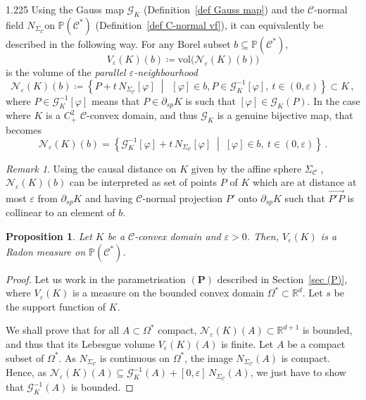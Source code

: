 \documentclass[reqno, a4paper]{amsart}
\numberwithin{equation}{section}
\numberwithin{figure}{section}
\newtheorem{proposition}[theorem]{Proposition}
\theoremstyle{definition}
\theoremstyle{remark}
\newtheorem{remark}[theorem]{Remark}
\newcommand{\R}{\mathbb{R}} %
\renewcommand{\P}{\mathbb{P}} %
\newcommand{\C}{\mathcal{C}} %
\renewcommand{\S}{\Sigma_\C} %
\newcommand{\G}{\mathcal{G}} %
\newcommand{\vol}{\mathrm{vol}} %
\newcommand{\st}{\; \middle\vert \;} %
\newcommand{\bp}[1]{{\bigl( {#1} \bigr)}} %
\begin{document}
\begin{spacing}{1.225}
Using the Gauss map $\G_K$ (Definition~\ref{def Gauss map}) and the $\C$-normal field $N_{\S} $on $\P(\C^*)$ (Definition~\ref{def C-normal vf}), it can equivalently be described in the following way. For any Borel subset $b \subseteq \P(\C^*)$,
\begin{equation*}
V_\varepsilon(K)(b) \coloneqq \vol \bp{\mathcal{N}_\varepsilon(K)(b)}  
\end{equation*}
is the volume of the \emph{parallel $\varepsilon$-neighbourhood} 
\begin{equation*}
\mathcal{N}_\varepsilon(K)(b) \coloneqq \left\lbrace P + t \, N_{\S} [\varphi]\st \ [\varphi]\in b, P \in \G_K^{-1}[\varphi], \ t \in (0,\varepsilon) \right\rbrace \subset K \, ,
\end{equation*}
where $P \in \G_K^{-1}[\varphi]$ means that $P \in \partial_{sp}K$ is such that $[\varphi] \in \G_K(P)$.
In the case where $K$ is a $C^2_+$ $\C$-convex domain, and thus $\G_K$ is a genuine bijective map, that becomes 
\begin{equation}
\label{eq eps neigh C2+}
\mathcal{N}_\varepsilon(K)(b) = \left\lbrace \G_{K}^{-1}[\varphi]+t \, N_{\S}[\varphi]\st [\varphi] \in b , \ t \in (0,\varepsilon )\right\rbrace \, . 
\end{equation}

\begin{remark}
Using the causal distance on $K$ given by the affine sphere $\Sigma_\C$ \cite[Section 6]{Ablondi_25}, $\mathcal{N}_\varepsilon(K)(b)$ can be interpreted as set of points $P$ of $K$ which are at distance at most $\varepsilon$ from $\partial_{sp}K$ and having $\C$-normal projection $P'$ onto $\partial_{sp}K$ such that $\overrightarrow{P'P}$ is collinear to an element of $b$. 
\end{remark}


\begin{proposition}
\label{prop Veps is Radon}
Let $K$ be a $\C$-convex domain and $\varepsilon>0$. Then, $V_\varepsilon(K)$ is a Radon measure on $\P(\C^*)$. 
\end{proposition}
\begin{proof}
Let us work in the parametrisation $(\mathbf{P})$ described in Section~\ref{sec (P)}, where $V_\varepsilon(K)$ is a measure on the bounded convex domain $\Omega^* \subset\R^d$. Let $s$ be the support function of $K$.

We shall prove that for all $A\subset \Omega^*$ compact, $\mathcal{N}_\varepsilon(K)(A) \subset \R^{d+1}$ is bounded, and thus that its Lebesgue volume $V_\varepsilon(K)(A)$ is finite. Let $A$ be a compact subset of $\Omega^*$. As $N_{\S}$ is continuous on $\Omega^*$, the image $N_{\S}(A)$ is compact. Hence, as $\mathcal{N}_\varepsilon (K)(A)\subseteq \G_K^{-1}(A)+[0,\varepsilon] \, N_{\S}(A)$, we just have to show that $\G_K^{-1}(A)$ is bounded. 


\end{proof}
\end{spacing}
\end{document}

